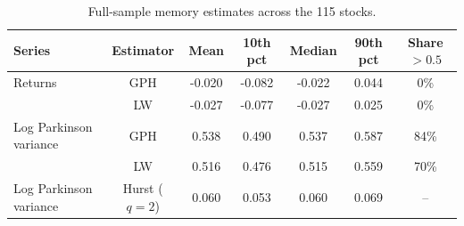 \begin{table}[H]
\caption{Full-sample memory estimates across the 115 stocks.}
\label{tab:memory}
\small
\begin{tabularx}{\textwidth}{Xcccccc}
\toprule
Series & Estimator & Mean & 10th pct & Median & 90th pct & Share $>0.5$ \\
\midrule
Returns & GPH & -0.020 & -0.082 & -0.022 & 0.044 & 0\% \\
 & LW & -0.027 & -0.077 & -0.027 & 0.025 & 0\% \\
Log Parkinson variance & GPH & 0.538 & 0.490 & 0.537 & 0.587 & 84\% \\
 & LW & 0.516 & 0.476 & 0.515 & 0.559 & 70\% \\
Log Parkinson variance & Hurst ($q=2$) & 0.060 & 0.053 & 0.060 & 0.069 & -- \\
\bottomrule
\end{tabularx}
\end{table}
